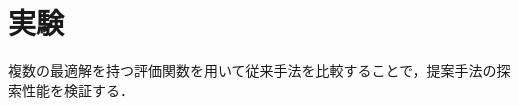 \documentclass[twocolumn, a4paper]{UECIEresume}
\begin{document}

\section{実験}
複数の最適解を持つ評価関数を用いて従来手法を比較することで，提案手法の探索性能を検証する．
\end{document}
